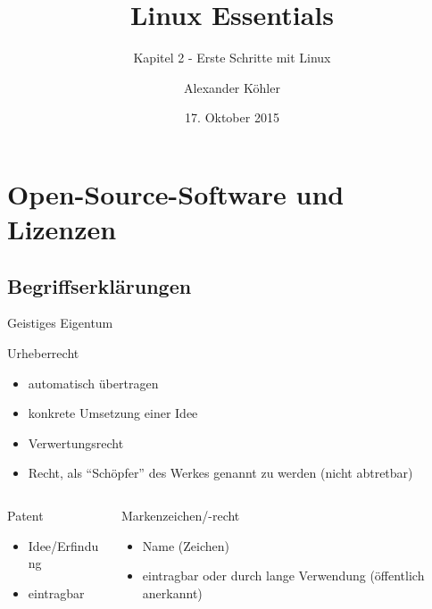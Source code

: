 \documentclass[aspectratio=43]{beamer}
\title[Linux Essentials  - Kapitel 2 - Erste Schritte mit Linux]{Linux Essentials}
\subtitle{Kapitel 2 - Erste Schritte mit Linux}
\author{Alexander Köhler}
\date{17. Oktober 2015}
\begin{document}
\logoframe

\frame{\titlepage}


\setcounter{tocdepth}{1}
\section[Gliederung]{}
\frame{\tableofcontents}


\section{Open-Source-Software und Lizenzen}
\subsection{Begriffserklärungen}

\begin{frame}{Geistiges Eigentum}
  \begin{block}{Urheberrecht}
    \begin{itemize}
      \item automatisch übertragen
      \item konkrete Umsetzung einer Idee
      \item Verwertungsrecht
      \item Recht, als ``Schöpfer'' des Werkes genannt zu werden (nicht abtretbar)
    \end{itemize}
  \end{block}
  \begin{columns}
    \begin{column}{.3\textwidth}
      \begin{block}{Patent}
        \begin{itemize}
          \item Idee/Erfindung
          \item eintragbar
        \end{itemize}
      \end{block}
    \end{column}
    \begin{column}{.7\textwidth}
      \begin{block}{Markenzeichen/-recht}
        \begin{itemize}
          \item Name (Zeichen)
          \item eintragbar oder durch lange Verwendung (öffentlich anerkannt)
        \end{itemize}
      \end{block}
    \end{column}
  \end{columns}
\end{frame}
\end{document}
